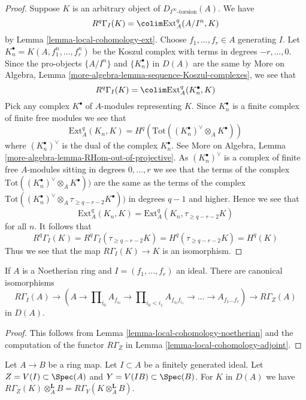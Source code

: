 \begin{proof}
\medskip\noindent
Suppose $K$ is an arbitrary object of $D_{I^\infty\text{-torsion}}(A)$.
We have
$$
R^q\Gamma_I(K) = \colim \text{Ext}^q_A(A/I^n, K)
$$
by Lemma \ref{lemma-local-cohomology-ext}. Choose $f_1, \ldots, f_r \in A$
generating $I$. Let $K_n^\bullet = K(A, f_1^n, \ldots, f_r^n)$ be the
Koszul complex with terms in degrees $-r, \ldots, 0$. Since the
pro-objects $\{A/I^n\}$ and $\{K_n^\bullet\}$ in $D(A)$ are the same by
More on Algebra, Lemma \ref{more-algebra-lemma-sequence-Koszul-complexes},
we see that
$$
R^q\Gamma_I(K) = \colim \text{Ext}^q_A(K_n^\bullet, K)
$$
Pick any complex $K^\bullet$ of $A$-modules representing $K$.
Since $K_n^\bullet$ is a finite complex of finite free modules we see
that
$$
\text{Ext}^q_A(K_n, K) =
H^q(\text{Tot}((K_n^\bullet)^\vee \otimes_A K^\bullet))
$$
where $(K_n^\bullet)^\vee$ is the dual of the complex $K_n^\bullet$.
See More on Algebra, Lemma \ref{more-algebra-lemma-RHom-out-of-projective}.
As $(K_n^\bullet)^\vee$ is a complex of finite free $A$-modules sitting
in degrees $0, \ldots, r$ we see that the terms of the complex
$\text{Tot}((K_n^\bullet)^\vee \otimes_A K^\bullet))$ are the
same as the terms of the complex
$\text{Tot}((K_n^\bullet)^\vee \otimes_A \tau_{\geq q - r - 2} K^\bullet))$
in degrees $q - 1$ and higher. Hence we see that
$$
\text{Ext}^q_A(K_n, K) = \text{Ext}^q_A(K_n, \tau_{\geq q - r - 2}K)
$$
for all $n$. It follows that
$$
R^q\Gamma_I(K) = R^q\Gamma_I(\tau_{\geq q - r - 2}K) =
H^q(\tau_{\geq q - r - 2}K) = H^q(K)
$$
Thus we see that the map $R\Gamma_I(K) \to K$ is an isomorphism.
\end{proof}

\begin{lemma}
\label{lemma-compute-local-cohomology-noetherian}
If $A$ is a Noetherian ring and $I = (f_1, \ldots, f_r)$ an ideal.
There are canonical isomorphisms
$$
R\Gamma_I(A) \to
(A \to \prod\nolimits_{i_0} A_{f_{i_0}} \to
\prod\nolimits_{i_0 < i_1} A_{f_{i_0}f_{i_1}} \to
\ldots \to A_{f_1\ldots f_r}) \to R\Gamma_Z(A)
$$
in $D(A)$.
\end{lemma}

\begin{proof}
This follows from Lemma \ref{lemma-local-cohomology-noetherian}
and the computation of the functor $R\Gamma_Z$ in
Lemma \ref{lemma-local-cohomology-adjoint}.
\end{proof}

\begin{lemma}
\label{lemma-torsion-change-rings}
Let $A \to B$ be a ring map. Let $I \subset A$ be a finitely generated
ideal. Let $Z = V(I) \subset \Spec(A)$ and $Y = V(IB) \subset \Spec(B)$.
For $K$ in $D(A)$ we have
$R\Gamma_Z(K) \otimes_A^\mathbf{L} B = R\Gamma_Y(K \otimes_A^\mathbf{L} B)$.
\end{lemma}


